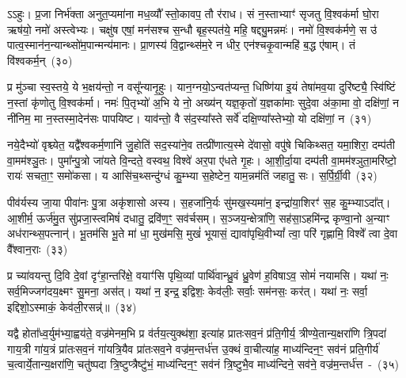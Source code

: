 ऽऽहुः। प्र॒जा निर्भ॑क्ता अनुत॒प्यमा॑ना मध॒व्यौ᳚ स्तो॒कावप॒ तौ र॑राध। सं न॒स्ताभ्याꣳ॑ सृजतु वि॒श्वक॑र्मा घो॒रा ऋष॑यो॒ नमो॑ अस्त्वेभ्यः। चक्षु॑ष एषां॒ मन॑सश्च स॒न्धौ बृह॒स्पत॑ये॒ महि॒ षद्द्यु॒मन्नमः॑। नमो॑ वि॒श्वक॑र्मणे॒ स उ॑ पात्व॒स्मान॑न॒न्यान्थ्सो॑म॒पान्मन्य॑मानः। प्रा॒णस्य॑ वि॒द्वान्थ्स॑म॒रे न धीर॒ एन॑श्चकृ॒वान्महि॑ ब॒द्ध ए॑षाम्। तं वि॑श्वकर्म॒न्~(३०)\ip

प्र मु॑ञ्चा स्व॒स्तये॒ ये भ॒क्षय॑न्तो॒ न वसू᳚न्यानृ॒हुः। यान॒ग्नयो॒\-ऽन्वत॑प्यन्त॒ धिष्णि॑या इ॒यं तेषा॑मव॒या दुरि॑ष्ट्यै॒ स्वि॑ष्टिं न॒स्तां कृ॑णोतु वि॒श्वक॑र्मा। नमः॑ पि॒तृभ्यो॑ अ॒भि ये नो॒ अख्य॑न् यज्ञ॒कृतो॑ य॒ज्ञका॑माः सुदे॒वा अ॑का॒मा वो॒ दक्षि॑णां॒ न नी॑निम॒ मा न॒स्तस्मा॒देन॑सः पापयिष्ट। याव॑न्तो॒ वै स॑द॒स्या᳚स्ते सर्वे॑ दक्षि॒ण्या᳚स्तेभ्यो॒ यो दक्षि॑णां॒ न~(३१)\ip

नये॒दैभ्यो॑ वृश्च्येत॒ यद्वै᳚श्वकर्म॒णानि॑ जु॒होति॑ सद॒स्या॑ने॒व तत्प्री॑णात्य॒स्मे दे॑वासो॒ वपु॑षे चिकिथ्सत॒ यमा॒शिरा॒ दम्प॑ती वा॒मम॑श्ञु॒तः। पुमा᳚न्पु॒त्रो जा॑यते वि॒न्दते॒ वस्वथ॒ विश्वे॑ अर॒पा ए॑धते गृ॒हः। आ॒शी॒र्दा॒या दम्प॑ती वा॒मम॑श्ञुता॒मरि॑ष्टो॒ रायः॑ सचता॒ꣳ॒ समो॑कसा। य आसि॑च॒थ्सन्दु॑ग्धं कु॒म्भ्या स॒हेष्टेन॒ याम॒न्नम॑तिं जहातु॒ सः। स॒र्पि॒र्ग्री॒वी~(३२)\ip


पीव॑र्यस्य जा॒या पीवा॑नः पु॒त्रा अकृ॑शासो अस्य। स॒हजा॑नि॒र्यः सु॑मख॒स्यमा॑न॒ इन्द्रा॑या॒शिरꣳ॑ स॒ह कु॒म्भ्या\-ऽदा᳚त्। आ॒शीर्म॒ ऊर्ज॑मु॒त सु॑प्रजा॒स्त्वमिषं॑ दधातु॒ द्रवि॑ण॒ꣳ॒ सव॑र्चसम्। स॒ञ्जय॒न्क्षेत्रा॑णि॒ सह॑सा॒\-ऽहमि॑न्द्र कृण्वा॒नो अ॒न्याꣳ अध॑रान्थ्स॒पत्नान्॑। भू॒तम॑सि भू॒ते मा॑ धा॒ मुख॑मसि॒ मुखं॑ भूयासं॒ द्यावा॑\-पृथि॒वी\-भ्यां᳚ त्वा॒ परि॑ गृह्णामि॒ विश्वे᳚ त्वा दे॒वा वै᳚श्वान॒राः~(३३)\ip

प्र च्या॑वयन्तु दि॒वि दे॒वां दृꣳ॑हा॒न्तरि॑क्षे॒ वयाꣳ॑सि पृथि॒व्यां पार्थि॑वान्ध्रु॒वं ध्रु॒वेण॑ ह॒विषा\-ऽव॒ सोमं॑ नयामसि। यथा॑ नः॒ सर्व॒मिज्जग॑दय॒क्ष्मꣳ सु॒मना॒ अस॑त्। यथा॑ न॒ इन्द्र॒ इद्विशः॒ केव॑लीः॒ सर्वाः॒ सम॑नसः॒ कर॑त्। यथा॑ नः॒ सर्वा॒ इद्दिशो॒\-ऽस्माकं॒ केव॑ली॒रसन्न्॑॥~(३४)\ip

{\anuvakamend[{एन॑सा विश्वकर्म॒न्॒ यो दक्षि॑णां॒ न स॑र्पिर्ग्री॒वी वै᳚श्वान॒राश्च॑त्वारि॒ꣳ॒शच्च॑}]}

यद्वै होता᳚ध्व॒र्युम॑भ्या॒ह्वय॑ते॒ वज्र॑मेनम॒भि प्र व॑र्तय॒त्युक्थ॑शा॒ इत्या॑ह प्रातःसव॒नं प्र॑ति॒गीर्य॒ त्रीण्ये॒तान्य॒क्षरा॑णि त्रि॒पदा॑ गाय॒त्री गा॑य॒त्रं प्रा॑तःसव॒नं गा॑यत्रि॒यैव प्रा॑तःसव॒ने वज्र॑म॒न्तर्ध॑त्त उ॒क्थं वा॒चीत्या॑ह॒ माध्य॑न्दिन॒ꣳ॒ सव॑नं प्रति॒गीर्य॑ च॒त्वार्ये॒तान्य॒क्षरा॑णि॒ चतु॑ष्पदा त्रि॒ष्टुप्त्रैष्टु॑भं॒ माध्य॑न्दिन॒ꣳ॒ सव॑नं त्रि॒ष्टुभै॒व माध्य॑न्दिने॒ सव॑ने॒ वज्र॑म॒न्तर्ध॑त्त~-~(३५)\ip

